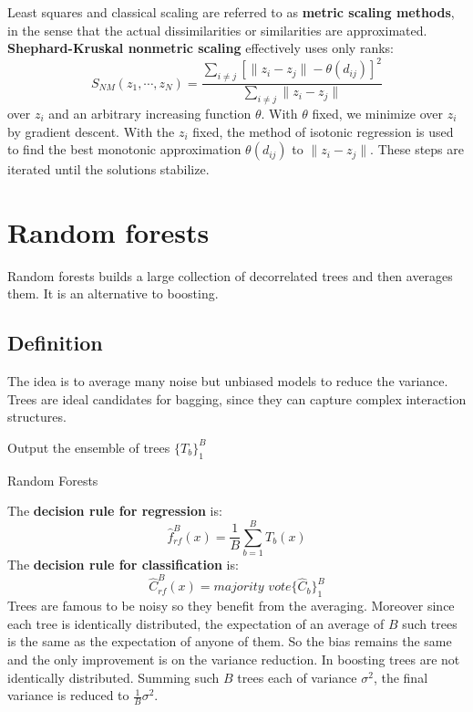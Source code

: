 \documentclass[12pt, letterpaper]{article}
\theoremstyle{definition}
\begin{document}
Least squares and classical scaling are referred to as \textbf{metric scaling methods}, in the sense that the actual dissimilarities or similarities are approximated. \textbf{Shephard-Kruskal nonmetric scaling} effectively uses only ranks:
\begin{equation}
S_{NM}(z_1, \cdots, z_N)  = \frac{\sum_{i\ne j} \left[ \|z_i - z_j\| - \theta(d_{ij})\right]^2}{\sum_{i\ne j}\|z_i - z_j\| }
\end{equation}
over $z_i$ and an arbitrary increasing function $\theta$. With $\theta$ fixed, we minimize over $z_i$ by gradient descent. With the $z_i$ fixed, the method of isotonic regression is used to find the best monotonic approximation $\theta(d_{ij})$ to $\|z_i - z_j \|$. These steps are iterated until the solutions stabilize.

\section{Random forests}
Random forests builds a large collection of decorrelated trees and then averages them. It is an alternative to boosting.
\subsection{Definition}
The idea is to average many noise but unbiased models to reduce the variance. Trees are ideal candidates for bagging, since they can capture complex interaction structures.
\begin{algorithm}
Output the ensemble of trees $\{T_b\}_1^B$\;
\caption{Random Forests}
\end{algorithm}
The \textbf{decision rule for regression} is:
\begin{equation}
\hat{f}_{rf}^B(x) = \frac{1}{B}\sum_{b=1}^BT_b(x) 
\end{equation}
The \textbf{decision rule for classification} is:
\begin{equation}
\hat{C}_{rf}^B(x) = \textit{majority vote}\{\hat{C}_b\}_1^B
\end{equation}
Trees are famous to be noisy so they benefit from the averaging. Moreover since each tree is identically distributed, the expectation of an average of $B$ such trees is the same as the expectation of anyone of them. So the bias remains the same and the only improvement is on the variance reduction. In boosting trees are not identically distributed.
Summing such $B$ trees each of variance $\sigma^2$, the final variance is reduced to $\frac{1}{B}\sigma^2$. 
\end{document}
